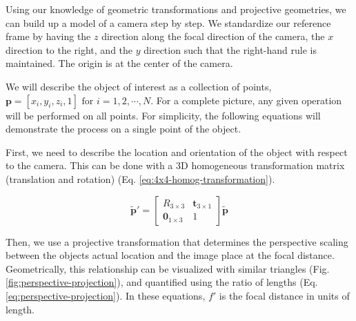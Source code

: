Using our knowledge of geometric transformations and projective geometries, we can build up a model of a camera step by step. We standardize our reference frame by having the $z$ direction along the focal direction of the camera, the $x$ direction to the right, and the $y$ direction such that the right-hand rule is maintained. The origin is at the center of the camera.

We will describe the object of interest as a collection of points, $\mathbf{p} =  [x_i, y_i, z_i, 1] \text{ for } i = 1,2,\cdots,N$. For a complete picture, any given operation will be performed on all points. For simplicity, the following equations will demonstrate the process on a single point of the object.

First, we need to describe the location and orientation of the object with respect to the camera. This can be done with a 3D homogeneous transformation matrix (translation and rotation) (Eq. \ref{eq:4x4-homog-transformation}).

\begin{equation}
    \tilde{\mathbf{p}}' = \begin{bmatrix}
        R_{3 \times 3} & \mathbf{t}_{3 \times 1} \\ \mathbf{0}_{1 \times 3} & 1
    \end{bmatrix} \tilde{\mathbf{p}}
    \label{eq:4x4-homog-transformation}
\end{equation}

Then, we use a projective transformation that determines the perspective scaling between the objects actual location and the image place at the focal distance. Geometrically, this relationship can be visualized with similar triangles (Fig. \ref{fig:perspective-projection}), and quantified using the ratio of lengths (Eq. \ref{eq:perspective-projection}). In these equations, $f'$ is the focal distance in units of length.

